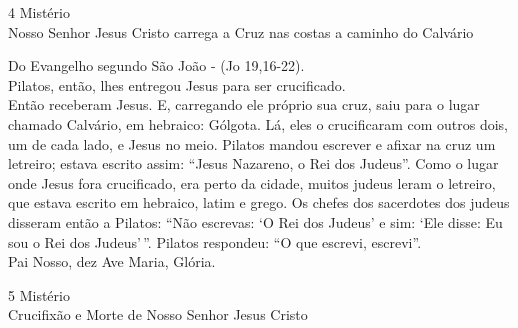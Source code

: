 \begin{center}
    4\textordmasculine{} Mistério \\ Nosso Senhor Jesus Cristo carrega a Cruz nas costas a caminho do Calvário
\end{center}
\begin{flushleft}
    Do Evangelho segundo São João - (\textcolor{VioletRed3}{Jo 19,16-22}). \\
    \hfill{} \break{}
    Pilatos, então, lhes entregou Jesus para ser crucificado.
    \vspace{.2cm} \\
    Então receberam Jesus. E, carregando ele próprio sua cruz, saiu para o lugar chamado Calvário, em hebraico: Gólgota. Lá, eles o crucificaram com outros dois, um de cada lado, e Jesus no meio. Pilatos mandou escrever e afixar na cruz um letreiro; estava escrito assim: ``Jesus Nazareno, o Rei dos Judeus''. Como o lugar onde Jesus fora crucificado, era perto da cidade, muitos judeus leram o letreiro, que estava escrito em hebraico, latim e grego. Os chefes dos sacerdotes dos judeus disseram então a Pilatos: ``Não escrevas: `O Rei dos Judeus' e sim: `Ele disse: Eu sou o Rei dos Judeus'\,''. Pilatos respondeu: ``O que escrevi, escrevi''. \\
    \hfill{} \break{}
    Pai Nosso, dez Ave Maria, Glória.
\end{flushleft}
\newpage
\begin{center}
    5\textordmasculine{} Mistério \\ Crucifixão e Morte de Nosso Senhor Jesus Cristo
\end{center}
